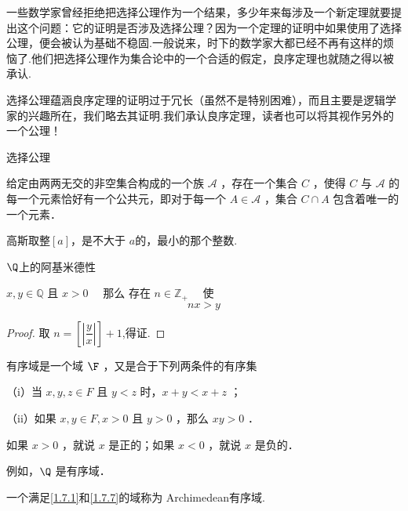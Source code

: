 一些数学家曾经拒绝把选择公理作为一个结果，多少年来每涉及一个新定理就要提出这个问题：它的证明是否涉及选择公理？因为一个定理的证明中如果使用了选择公理，便会被认为基础不稳固.一般说来，时下的数学家大都已经不再有这样的烦恼了.他们把选择公理作为集合论中的一个合适的假定，良序定理也就随之得以被承认.

选择公理蕴涵良序定理的证明过于冗长（虽然不是特别困难），而且主要是逻辑学家的兴趣所在，我们略去其证明.我们承认良序定理，读者也可以将其视作另外的一个公理！

\begin{axiom}选择公理
	
	给定由两两无交的非空集合构成的一个族 $\mathcal{A}$ ，存在一个集合 $C$ ，使得 $C$ 与 $\mathcal{A}$ 的每一个元素恰好有一个公共元，即对于每一个 $A \in \mathcal{A}$ ，集合 $C \cap A$ 包含着唯一的一个元素．
\end{axiom}
\begin{definition}
	高斯取整$\left[a\right]$，是不大于 $a $的，最小的那个整数.
	
\end{definition}
\begin{proposition}
	$\Q$上的阿基米德性
	
	$x, y \in \mathbb{Q}$ 且 $x>0 \quad$ 那么 存在 $n \in \mathbb{Z}_{+} \quad$ 使
	\[	n x>y\]\label{1.7.7}
\end{proposition}

\begin{proof}
	取 $n=\left[|\dfrac{y}{x}|\right]+1$,得证.    	
	
\end{proof}
\begin{definition}\label{有序域}
	有序域是一个域 $\F$ ，又是合于下列两条件的有序集
	
	（i）当 $x, y, z \in F$ 且 $y<z$ 时，$x+y<x+z$ ；
	
	（ii）如果 $x, y \in F, x>0$ 且 $y>0$ ，那么 $x y>0$ ．
	
	如果 $x>0$ ，就说 $x$ 是正的；如果 $x<0$ ，就说 $x$ 是负的．
	
	例如，$\Q$ 是有序域．
	
\end{definition}

一个满足\ref{1.7.1}和\ref{1.7.7}的域称为 Archimedean有序域.



